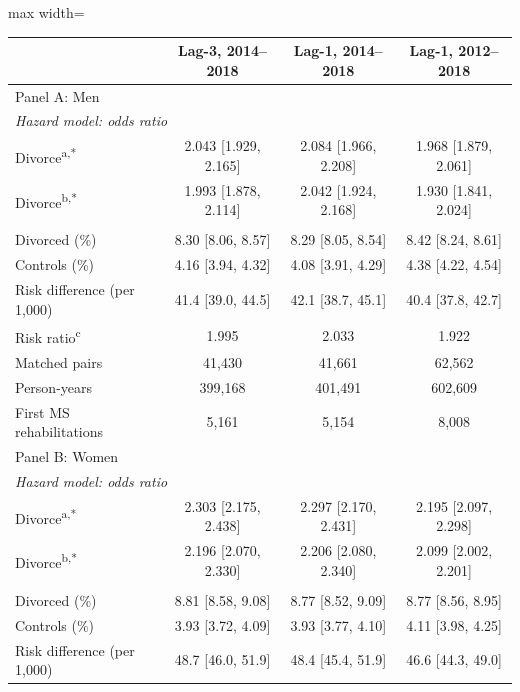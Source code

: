 \documentclass[a4paper,12pt]{article}
\theoremstyle{plain}
\theoremstyle{definition}
\theoremstyle{TheoremNum}
\theoremstyle{CorollaryNum}
\theoremstyle{PropositionNum}
\theoremstyle{TheoremNum}
\begin{document}
\begin{table}[H]
\centering
\small
\begin{adjustbox}{max width=\textwidth}
\begin{tabular}{@{}lccc@{}}
\toprule
 & Lag-3, 2014--2018 & Lag-1, 2014--2018 & Lag-1, 2012--2018 \\
\midrule
\multicolumn{4}{l}{Panel A: Men} \\ \hline
\multicolumn{4}{l}{\textit{Hazard model: odds ratio}} \\
Divorce\textsuperscript{a,*} & 2.043 [1.929, 2.165] & 2.084 [1.966, 2.208] & 1.968 [1.879, 2.061] \\
Divorce\textsuperscript{b,*} & 1.993 [1.878, 2.114] & 2.042 [1.924, 2.168] & 1.930 [1.841, 2.024] \\
\addlinespace
\multicolumn{4}{l}{\textit{Cumulative incidence at five years}} \\
Divorced (\%) & 8.30 [8.06, 8.57] & 8.29 [8.05, 8.54] & 8.42 [8.24, 8.61] \\
Controls (\%) & 4.16 [3.94, 4.32] & 4.08 [3.91, 4.29] & 4.38 [4.22, 4.54] \\
Risk difference (per 1,000) & 41.4 [39.0, 44.5] & 42.1 [38.7, 45.1] & 40.4 [37.8, 42.7] \\
Risk ratio\textsuperscript{c} & 1.995 & 2.033 & 1.922 \\
\addlinespace
\hline
Matched pairs & 41,430 & 41,661 & 62,562 \\
Person-years & 399,168 & 401,491 & 602,609 \\
First MS rehabilitations & 5,161 & 5,154 & 8,008 \\
\midrule
\multicolumn{4}{l}{Panel B: Women} \\ \hline
\multicolumn{4}{l}{\textit{Hazard model: odds ratio}} \\
Divorce\textsuperscript{a,*} & 2.303 [2.175, 2.438] & 2.297 [2.170, 2.431] & 2.195 [2.097, 2.298] \\
Divorce\textsuperscript{b,*} & 2.196 [2.070, 2.330] & 2.206 [2.080, 2.340] & 2.099 [2.002, 2.201] \\
\addlinespace
\multicolumn{4}{l}{\textit{Cumulative incidence at five years}} \\
Divorced (\%) & 8.81 [8.58, 9.08] & 8.77 [8.52, 9.09] & 8.77 [8.56, 8.95] \\
Controls (\%) & 3.93 [3.72, 4.09] & 3.93 [3.77, 4.10] & 4.11 [3.98, 4.25] \\
Risk difference (per 1,000) & 48.7 [46.0, 51.9] & 48.4 [45.4, 51.9] & 46.6 [44.3, 49.0] \\

\end{tabular}
\end{adjustbox}
\end{table}
\end{document}
